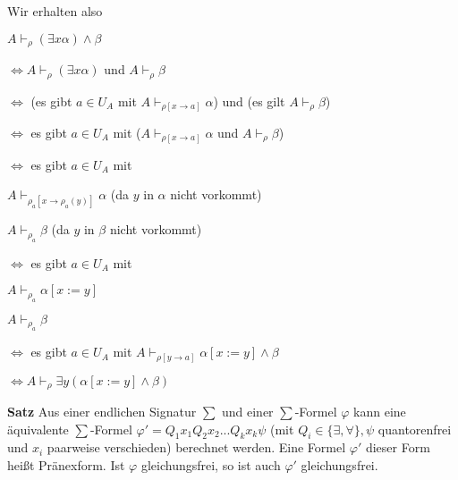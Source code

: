 \documentclass[a4paper]{article}
\renewcommand{\note}[2]{\begin{noteBox} \textbf{#1} #2 \end{noteBox}}
\begin{document}
\begin{multicols}{3}
  Wir erhalten also
  \begin{itemize*}
    \item $A\vdash_\rho (\exists x\alpha)\wedge\beta$
    \item $\Leftrightarrow A\vdash_\rho (\exists x\alpha) $ und $A\vdash_\rho \beta$
    \item $\Leftrightarrow$ (es gibt $a\in U_A$ mit $A\vdash_{\rho[x\rightarrow a]}\alpha$) und (es gilt $A\vdash_\rho \beta$)
    \item $\Leftrightarrow$ es gibt $a\in U_A$ mit ($A\vdash_{\rho[x\rightarrow a]}\alpha$ und $A\vdash_\rho \beta$)
    \item $\Leftrightarrow$ es gibt $a\in U_A$ mit
    \begin{itemize*}
      \item $A\vdash_{\rho_a[x\rightarrow \rho_a(y)]}\alpha$ (da $y$ in $\alpha$ nicht vorkommt)
      \item $A\vdash_{\rho_a} \beta$ (da $y$ in $\beta$ nicht vorkommt)
    \end{itemize*}
    \item $\Leftrightarrow$ es gibt $a\in U_A$ mit
    \begin{itemize*}
      \item $A\vdash_{\rho_a} \alpha[x:=y]$
      \item $A\vdash_{\rho_a} \beta$
    \end{itemize*}
    \item $\Leftrightarrow$ es gibt $a\in U_A$ mit $A\vdash_{\rho[y\rightarrow a]}\alpha[x:=y]\wedge\beta$
    \item $\Leftrightarrow A\vdash_\rho \exists y(\alpha[x:=y]\wedge\beta)$
  \end{itemize*}

  \note{Satz}{Aus einer endlichen Signatur $\sum$ und einer $\sum$-Formel $\varphi$ kann eine äquivalente $\sum$-Formel $\varphi'=Q_1 x_1 Q_2 x_2 ...Q_k x_k \psi$ (mit $Q_i\in\{\exists,\forall\},\psi$ quantorenfrei und $x_i$ paarweise verschieden) berechnet werden. Eine Formel $\varphi'$ dieser Form heißt Pränexform.
    Ist $\varphi$ gleichungsfrei, so ist auch $\varphi'$ gleichungsfrei.}


\end{multicols}
\end{document}
